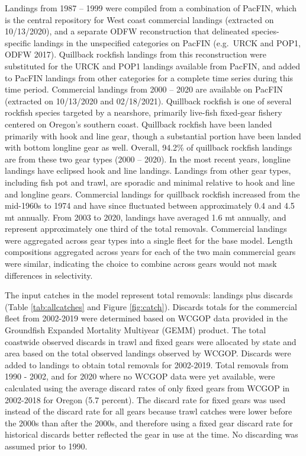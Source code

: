 \documentclass[11pt,
  english,
  a4paper,
]{article}
\begin{document}
Landings from 1987 -- 1999 were compiled from a combination of PacFIN, which is the central repository for West coast commercial landings (extracted on 10/13/2020), and a separate ODFW reconstruction that delineated species-specific landings in the unspecified categories on PacFIN (e.g.~URCK and POP1, ODFW 2017). Quillback rockfish landings from this reconstruction were substituted for the URCK and POP1 landings available from PacFIN, and added to PacFIN landings from other categories for a complete time series during this time period. Commercial landings from 2000 -- 2020 are available on PacFIN (extracted on 10/13/2020 and 02/18/2021). Quillback rockfish is one of several rockfish species targeted by a nearshore, primarily live-fish fixed-gear fishery centered on Oregon's southern coast. Quillback rockfish have been landed primarily with hook and line gear, though a substantial portion have been landed with bottom longline gear as well. Overall, 94.2\% of quillback rockfish landings are from these two gear types (2000 -- 2020). In the most recent years, longline landings have eclipsed hook and line landings. Landings from other gear types, including fish pot and trawl, are sporadic and minimal relative to hook and line and longline gears. Commercial landings for quillback rockfish increased from the mid-1960s to 1974 and have since fluctuated between approximately 0.4 and 4.5 mt annually. From 2003 to 2020, landings have averaged 1.6 mt annually, and represent approximately one third of the total removals. Commercial landings were aggregated across gear types into a single fleet for the base model. Length compositions aggregated across years for each of the two main commercial gears were similar, indicating the choice to combine across gears would not mask differences in selectivity.

\leavevmode\tagmcend\tagstructend\par


The input catches in the model represent total removals: landings plus discards (Table \ref{tab:allcatches} and Figure \ref{fig:catch}). Discards totals for the commercial fleet from 2002-2019 were determined based on WCGOP data provided in the Groundfish Expanded Mortality Multiyear (GEMM) product. The total coastwide observed discards in trawl and fixed gears were allocated by state and area based on the total observed landings observed by WCGOP. Discards were added to landings to obtain total removals for 2002-2019. Total removals from 1990 - 2002, and for 2020 where no WCGOP data were yet available, were calculated using the average discard rates of only fixed gears from WCGOP in 2002-2018 for Oregon (5.7 percent). The discard rate for fixed gears was used instead of the discard rate for all gears because trawl catches were lower before the 2000s than after the 2000s, and therefore using a fixed gear discard rate for historical discards better reflected the gear in use at the time. No discarding was assumed prior to 1990.
\end{document}
